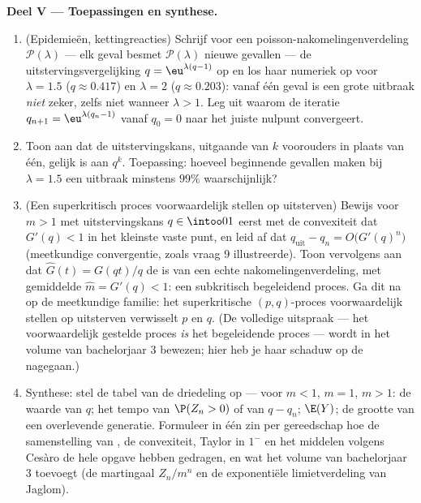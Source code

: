 \begin{problem}
\medskip
\noindent\textbf{Deel V --- Toepassingen en synthese.}
\begin{enumerate}[resume]
  \item (Epidemieën, kettingreacties) Schrijf voor een
        poisson-nakomelingenverdeling $\mathcal P(\lambda)$ ---
        elk geval besmet $\mathcal P(\lambda)$ nieuwe gevallen ---
        de uitstervingsvergelijking $q = \eu^{\lambda(q-1)}$ op en
        los haar numeriek op voor $\lambda = 1.5$ ($q \approx
        0.417$) en $\lambda = 2$ ($q \approx 0.203$): vanaf één
        geval is een grote uitbraak \emph{niet} zeker, zelfs niet
        wanneer $\lambda > 1$. Leg uit waarom de iteratie $q_{n+1}
        = \eu^{\lambda(q_n - 1)}$ vanaf $q_0 = 0$ naar het juiste
        nulpunt convergeert.
  \item Toon aan dat de uitstervingskans, uitgaande van $k$
        voorouders in plaats van één, gelijk is aan $q^k$.
        Toepassing: hoeveel beginnende gevallen maken bij $\lambda
        = 1.5$ een uitbraak minstens $99\%$ waarschijnlijk?
  \item (Een superkritisch proces voorwaardelijk stellen op
        uitsterven) Bewijs voor $m > 1$ met uitstervingskans $q \in
        \intoo01$ eerst met de convexiteit dat $G'(q) < 1$ in het
        kleinste vaste punt, en leid af dat $q_{\mathrm{uit}} - q_n
        = O\bigl(G'(q)^n\bigr)$ (meetkundige convergentie, zoals
        vraag 9 illustreerde). Toon vervolgens aan dat $\widehat
        G(t) = G(qt)/q$ de  is van een echte
        nakomelingenverdeling, met gemiddelde $\widehat m = G'(q) <
        1$: een subkritisch begeleidend proces. Ga dit na op de
        meetkundige familie: het superkritische
        $(p, q)$-proces voorwaardelijk stellen op uitsterven
        verwisselt $p$ en $q$. (De volledige uitspraak --- het
        voorwaardelijk gestelde proces \emph{is} het begeleidende
        proces --- wordt in het volume van bachelorjaar 3 bewezen;
        hier heb je haar schaduw op de 
        nagegaan.)
  \item Synthese: stel de tabel van de driedeling op --- voor $m <
        1$, $m = 1$, $m > 1$: de waarde van $q$; het tempo van
        $\P(Z_n > 0)$ of van $q - q_n$; $\E(Y)$; de grootte van een
        overlevende generatie. Formuleer in één zin per gereedschap
        hoe de samenstelling van , de
        convexiteit, Taylor in $1^-$ en het middelen volgens Cesàro
        de hele opgave hebben gedragen, en wat het volume van
        bachelorjaar 3 toevoegt (de martingaal $Z_n/m^n$ en de
        exponentiële limietverdeling van Jaglom).
\end{enumerate}
\end{problem}
